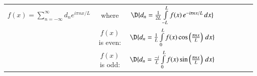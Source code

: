 \documentclass[11pt]{article}
\begin{document}

\setlength{\extrarowheight}{0.1cm}
\begin{tabular}{cccccclc}
	$f(x)= 
	\sum \limits_{n=-\infty}^{\infty} d_n e^{i \pi n x/L}$
	& where & $\D{d_n = 
	\frac{1}{2L}\int \limits_{-L}^{L} f(x)\, e^{-i\pi nx/L} \, dx}$ & \\
	&
	$f(x)$ is even: & $\D{d_n =
	\frac{1}{L}\int \limits_{0}^{L} f(x) \cos\left(\frac{\pi nx}{L}\right)	\,dx}$ & \\
	&
	$f(x)$ is odd: & $\D{d_n =
	\frac{-i}{L}\int \limits_{0}^{L} f(x) \sin\left(\frac{\pi nx}{L}\right)	\,dx}$ & \\
\end{tabular}
\end{document}
